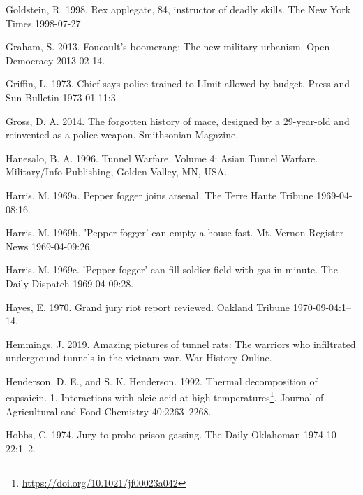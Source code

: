 \documentclass[
  11pt,
]{krantz}
\newlength{\cslhangindent}
\newlength{\cslentryspacingunit} %
\newenvironment{CSLReferences}[2] %
 {%
  \setlength{\parindent}{0pt}
  \ifodd #1
  \let\oldpar\par
  \def\par{\hangindent=\cslhangindent\oldpar}
  \fi
  \setlength{\parskip}{#2\cslentryspacingunit}
 }%
 {}
\renewcommand{\href}[2]{#2\footnote{\url{#1}}}
\begin{document}
\begin{CSLReferences}{1}{0}
\leavevmode{}%
Goldstein, R. 1998. Rex applegate, 84, instructor of deadly skills. The New York Times 1998-07-27.

\leavevmode{}%
Graham, S. 2013. Foucault's boomerang: The new military urbanism. Open Democracy 2013-02-14.

\leavevmode{}%
Griffin, L. 1973. Chief says police trained to LImit allowed by budget. Press and Sun Bulletin 1973-01-11:3.

\leavevmode{}%
Gross, D. A. 2014. The forgotten history of mace, designed by a 29-year-old and reinvented as a police weapon. Smithsonian Magazine.

\leavevmode{}%
Hanesalo, B. A. 1996. {Tunnel Warfare, Volume 4: Asian Tunnel Warfare}. Military/Info Publishing, Golden Valley, MN, USA.

\leavevmode{}%
Harris, M. 1969a. Pepper fogger joins arsenal. The Terre Haute Tribune 1969-04-08:16.

\leavevmode{}%
Harris, M. 1969b. 'Pepper fogger' can empty a house fast. Mt. Vernon Register-News 1969-04-09:26.

\leavevmode{}%
Harris, M. 1969c. 'Pepper fogger' can fill soldier field with gas in minute. The Daily Dispatch 1969-04-09:28.

\leavevmode{}%
Hayes, E. 1970. Grand jury riot report reviewed. Oakland Tribune 1970-09-04:1--14.

\leavevmode{}%
Hemmings, J. 2019. Amazing pictures of tunnel rats: The warriors who infiltrated underground tunnels in the vietnam war. War History Online.

\leavevmode{}%
Henderson, D. E., and S. K. Henderson. 1992. \href{https://doi.org/10.1021/jf00023a042}{Thermal decomposition of capsaicin. 1. Interactions with oleic acid at high temperatures}. Journal of Agricultural and Food Chemistry 40:2263--2268.

\leavevmode{}%
Hobbs, C. 1974. Jury to probe prison gassing. The Daily Oklahoman 1974-10-22:1--2.


\end{CSLReferences}
\end{document}
